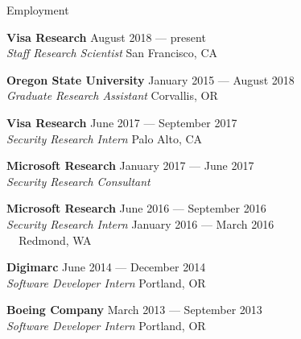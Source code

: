 \documentclass{resume} %
\begin{document}
\begin{rSection}{Employment}

{\bf Visa Research} \hfill {August 2018 --- present}\\
{\emph{Staff Research Scientist } \hfill {San Francisco, CA}}

{\bf Oregon State University} \hfill {January 2015 --- August 2018}\\
{\emph{Graduate Research Assistant} \hfill {Corvallis, OR}}

{\bf Visa Research} \hfill {June 2017 --- September 2017}\\
{\emph{Security Research Intern} \hfill {Palo Alto, CA}}

{\bf Microsoft Research} \hfill {January 2017 --- June 2017}\\
{\emph{Security Research Consultant} }

{\bf Microsoft Research} \hfill {June 2016 --- September 2016}\\
{\emph{Security Research Intern} \hfill {January 2016 --- March 2016}\\
\textcolor{white}{\_}		\hfill {Redmond, WA}}


{\bf Digimarc} \hfill {June 2014 --- December 2014}\\
{\emph{Software Developer Intern} \hfill {Portland, OR}}

{\bf Boeing Company} \hfill {March 2013 --- September 2013}\\
{\emph{Software Developer Intern} \hfill {Portland, OR}}



\end{rSection}

\end{document}

